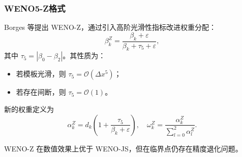 \documentclass[12pt,a4paper]{article}
\numberwithin{equation}{section}    %
\begin{document}
\subsubsection{WENO5-Z格式}

Borges 等提出 WENO-Z，通过引入高阶光滑性指标改进权重分配：
\begin{equation}
\beta_k^{Z} = \frac{\beta_k + \varepsilon}{\beta_k + \tau_5 + \varepsilon},
\end{equation}
其中 $\tau_5 = |\beta_0 - \beta_2|$。其性质为：
\begin{itemize}
\item 若模板光滑，则 $\tau_5 = \mathcal{O}(\Delta x^5)$；
\item 若存在间断，则 $\tau_5 = \mathcal{O}(1)$。
\end{itemize}

新的权重定义为
\begin{equation}
\alpha_k^{Z} = d_k\left(1+\frac{\tau_5}{\beta_k+\varepsilon}\right),\quad
\omega_k^{Z} = \frac{\alpha_k^{Z}}{\sum_{l=0}^2 \alpha_l^{Z}}.
\end{equation}

WENO-Z 在数值效果上优于 WENO-JS，但在临界点仍存在精度退化问题。


\end{document}
